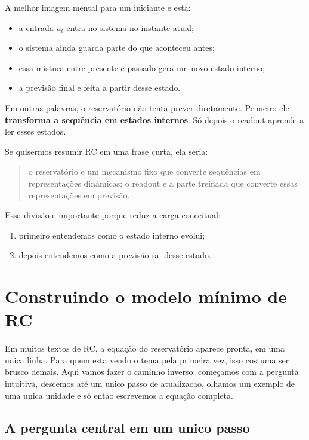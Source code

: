 \documentclass[12pt]{article}
\providecommand{\tightlist}{%
  \setlength{\itemsep}{0pt}\setlength{\parskip}{0pt}}
\begin{document}
A melhor imagem mental para um iniciante e esta:

\begin{itemize}
\tightlist
\item
  a entrada \(u_t\) entra no sistema no instante atual;
\item
  o sistema ainda guarda parte do que aconteceu antes;
\item
  essa mistura entre presente e passado gera um novo estado interno;
\item
  a previsão final e feita a partir desse estado.
\end{itemize}

Em outras palavras, o reservatório não tenta prever diretamente. Primeiro ele \textbf{transforma a sequência em estados internos}. Só depois o readout aprende a ler esses estados.

Se quisermos resumir RC em uma frase curta, ela seria:

\begin{quote}
o reservatório e um mecanismo fixo que converte sequências em representações dinâmicas; o readout e a parte treinada que converte essas representações em previsão.
\end{quote}

Essa divisão e importante porque reduz a carga conceitual:

\begin{enumerate}
\def\labelenumi{\arabic{enumi}.}
\tightlist
\item
  primeiro entendemos como o estado interno evolui;
\item
  depois entendemos como a previsão sai desse estado.
\end{enumerate}

\section{Construindo o modelo mínimo de RC}\label{3-construindo-o-modelo-muxednimo-de-rc}

Em muitos textos de RC, a equação do reservatório aparece pronta, em uma unica linha. Para quem esta vendo o tema pela primeira vez, isso costuma ser brusco demais. Aqui vamos fazer o caminho inverso: começamos com a pergunta intuitiva, descemos até um unico passo de atualizacao, olhamos um exemplo de uma unica unidade e só entao escrevemos a equação completa.

\subsection{A pergunta central em um unico passo}\label{31-a-pergunta-central-em-um-unico-passo}
\end{document}
